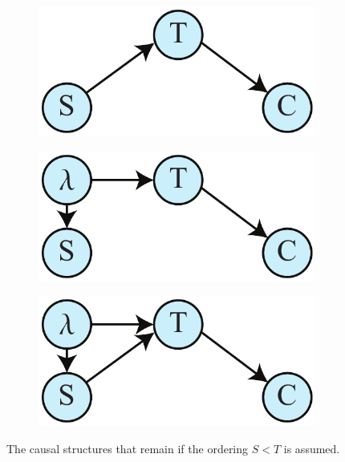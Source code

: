 \documentclass[letterpaper,onecolumn,nofootinbib]{revtex4}
\begin{document}
\begin{figure}[h]
		\hspace{4em}
	        \begin{subfigure}[b]{0.2\textwidth}
                	\centering
                	\includegraphics[width=\textwidth]{smoke-ic-ord1}
		\end{subfigure}
		\hspace{5em}		
		\begin{subfigure}[b]{0.2\textwidth}
                	\centering
                	\includegraphics[width=\textwidth]{smoke-ic-ord2}
		\end{subfigure}
		\hspace{5em}
		\begin{subfigure}[b]{0.2\textwidth}
                	\centering
                	\includegraphics[width=\textwidth]{smoke-ic-ord3}
		\end{subfigure}
 \caption{The causal structures that remain if the ordering $S<T$ is assumed.}
       \label{fig:smoke-icstar-ord}
\end{figure}
\end{document}
